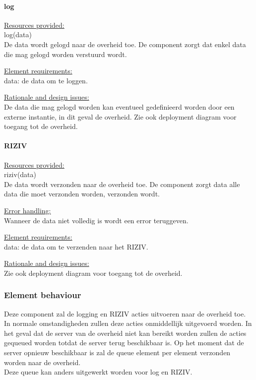 \documentclass[a4paper,10pt]{article}
\begin{document}
\paragraph{log}
\underline{Resources provided:}\\
log(data)\\
De data wordt gelogd naar de overheid toe.  De component zorgt dat enkel data die mag gelogd worden verstuurd wordt.

\underline{Element requirements:}\\
data: de data om te loggen.

\underline{Rationale and design issues:}\\
De data die mag gelogd worden kan eventueel gedefinieerd worden door een externe instantie, in dit geval de overheid.
Zie ook deployment diagram voor toegang tot de overheid.

\paragraph{RIZIV}
\underline{Resources provided:}\\
riziv(data)\\
De data wordt verzonden naar de overheid toe.  De component zorgt data alle data die moet verzonden worden, verzonden wordt.

\underline{Error handling:}\\
Wanneer de data niet volledig is wordt een error teruggeven.

\underline{Element requirements:}\\
data: de data om te verzenden naar het RIZIV.

\underline{Rationale and design issues:}\\
Zie ook deployment diagram voor toegang tot de overheid.

\subsubsection{Element behaviour}
Deze component zal de logging en RIZIV acties uitvoeren naar de overheid toe.  In normale omstandigheden zullen deze acties onmiddellijk uitgevoerd worden.  In het geval dat de server van de overheid niet kan bereikt worden zullen de acties gequeued worden totdat de server terug beschikbaar is.  Op het moment dat de server opnieuw beschikbaar is zal de queue element per element verzonden worden naar de overheid.\\
Deze queue kan anders uitgewerkt worden voor log en RIZIV.
\end{document}
